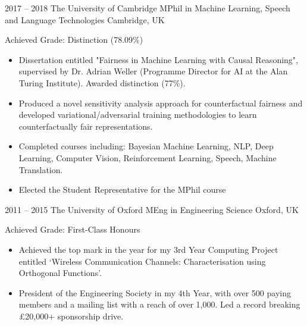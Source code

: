 \documentclass[]{friggeri-cv} %
\begin{document}
\begin{entrylist}


\entry
{2017 -- 2018}
{The University of Cambridge}
{MPhil {\normalfont in Machine Learning, Speech and Language Technologies }}
{Cambridge, UK}
{Achieved Grade: Distinction (78.09\%)
	\begin{itemize}
        \item Dissertation entitled "Fairness in Machine Learning with Causal Reasoning", supervised by Dr. Adrian Weller (Programme Director for AI at the Alan Turing Institute). Awarded distinction (77\%).
        \item Produced a novel sensitivity analysis approach for counterfactual fairness and developed variational/adversarial training methodologies to learn counterfactually fair representations. 
        \item Completed courses including: Bayesian Machine Learning, NLP, Deep Learning, Computer Vision, Reinforcement Learning, Speech, Machine Translation.
        \item Elected the Student Representative for the MPhil course
	\end{itemize}}



\entry
{2011 -- 2015}
{The University of Oxford}
{MEng {\normalfont in Engineering Science}}
{Oxford, UK}
{Achieved Grade: First-Class Honours
	\begin{itemize}
		\item Achieved the top mark in the year for my 3rd Year Computing Project entitled `Wireless Communication Channels: Characterisation using Orthogonal Functions'.
		\item President of the Engineering Society in my 4th Year, with over 500 paying members and a mailing list with a reach of over 1,000. Led a record breaking £20,000+ sponsorship drive.
	\end{itemize}}


\end{entrylist}

\end{document}
